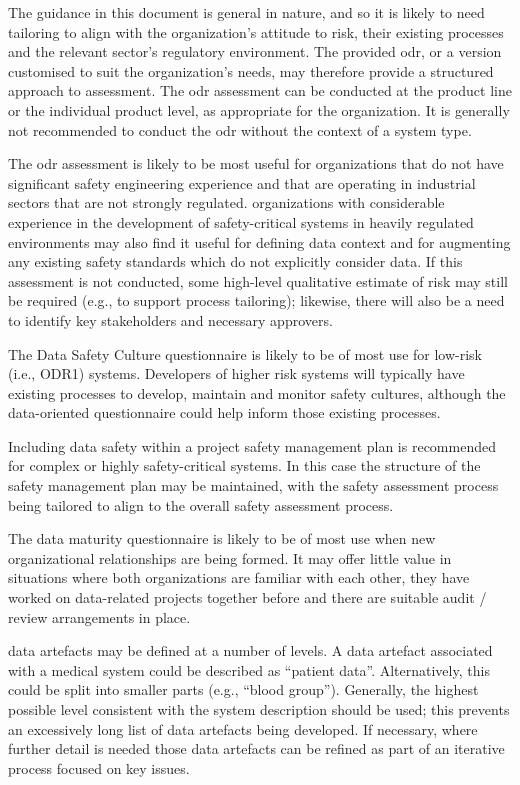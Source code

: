 The guidance in this document is general in nature, and so it is likely to need \gls{tailoring} to align with the organization's attitude to risk, their existing processes and the relevant sector's regulatory environment. The provided \gls{odr}, or a version customised to suit the organization's needs, may therefore provide a structured approach to assessment.
The \gls{odr} assessment can be conducted at the product line or the individual product level, as appropriate for the organization. It is generally not recommended to conduct the \gls{odr} without the context of a system type.

The \gls{odr} assessment is likely to be most useful for organizations that do not have significant safety engineering experience and that are operating in industrial sectors that are not strongly regulated.
organizations with considerable experience in the development of safety-critical systems in heavily regulated environments
may also find it useful for defining data context and for augmenting any existing safety standards which do not explicitly consider data.
If this assessment is not conducted, some high-level qualitative estimate of risk may still be required (e.g., to support process \gls{tailoring}); likewise, there will also be a need to identify key \glspl{stakeholder} and necessary approvers.

The Data Safety Culture questionnaire is likely to be of most use for low-risk (i.e., ODR1) systems. Developers of higher risk systems will typically have existing processes to develop, maintain and monitor safety cultures, although the data-oriented questionnaire could help inform those existing processes.

Including data safety within a project safety management plan is recommended for complex or highly safety-critical systems. In this case the structure of the safety management plan may be maintained, with the \gls{safety assessment} process being tailored to align to the overall safety assessment process.

The data maturity questionnaire is likely to be of most use when new organizational relationships are being formed. It may offer little value in situations where both organizations are familiar with each other, they have worked on data-related projects together before and there are suitable audit / review arrangements in place.

\Glspl{data artefact} may be defined at a number of levels. A \gls{data artefact} associated with a medical system could be described as ``patient data''. Alternatively, this could be split into smaller parts (e.g., ``blood group''). Generally, the highest possible level consistent with the system description should be used; this prevents an excessively long list of \glspl{data artefact} being developed. If necessary, where further detail is needed those \glspl{data artefact} can be refined as part of an iterative process focused on key issues.

